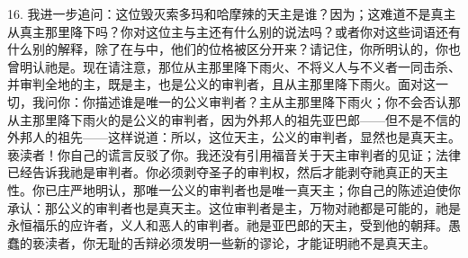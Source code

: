 16. 我进一步追问：这位毁灭索多玛和哈摩辣的天主是谁？因为\newline{}；这难道不是真主从真主那里降下吗？\newline{}你对这位主与主还有什么别的说法吗？\newline{}或者你对这些词语还有什么别的解释，除了在与中，他们的位格被区分开来？\newline{}请记住，你所明认的，你也曾明认祂是。\newline{}现在请注意，那位从主那里降下雨火、不将义人与不义者一同击杀、并审判全地的主，\newline{}既是主，也是公义的审判者，且从主那里降下雨火。\newline{}面对这一切，我问你：你描述谁是唯一的公义审判者？\newline{}主从主那里降下雨火；你不会否认那从主那里降下雨火的是公义的审判者，\newline{}因为外邦人的祖先亚巴郎——但不是不信的外邦人的祖先——这样说道：\newline{}\newline{}\newline{}所以，这位天主，公义的审判者，显然也是真天主。\newline{}亵渎者！你自己的谎言反驳了你。\newline{}我还没有引用福音关于天主审判者的见证；法律已经告诉我祂是审判者。\newline{}你必须剥夺圣子的审判权，然后才能剥夺祂真正的天主性。\newline{}你已庄严地明认，那唯一公义的审判者也是唯一真天主；\newline{}你自己的陈述迫使你承认：那公义的审判者也是真天主。\newline{}这位审判者是主，万物对祂都是可能的，祂是永恒福乐的应许者，义人和恶人的审判者。\newline{}祂是亚巴郎的天主，受到他的朝拜。\newline{}愚蠢的亵渎者，你无耻的舌辩必须发明一些新的谬论，才能证明祂不是真天主。\par

